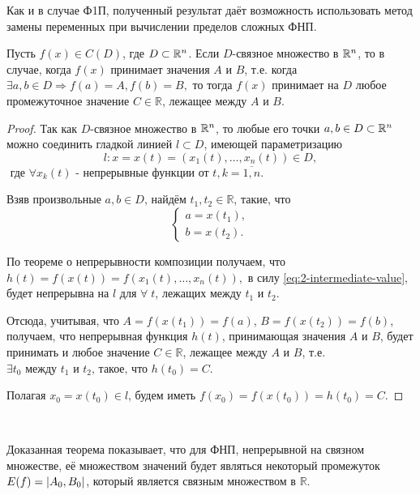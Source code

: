 \begin{note}
	Как и в случае Ф1П, полученный результат даёт возможность использовать метод замены переменных
	при вычислении пределов сложных ФНП.
\end{note}

\begin{theorem}
	Пусть $f(x) \in C(D)$, где $D \subset \mathbb{R}^{n}$. Если $D$-связное множество в $\mathbb{R}^{n}$, то в случае,
	когда $f(x)$ принимает значения $A$ и $B$, т.е. когда
  $   \exists a, b \in D \Rightarrow f(a) = A, f(b) =  B, $
	то тогда $f(x)$ принимает на $D$ любое промежуточное значение $C \in \mathbb{R}$, лежащее между
	$A$ и $B$.
\end{theorem}

\begin{proof}
	Так как $D$-связное множество в $\mathbb{R}^{n}$, то любые его точки $a, b \in D \subset \mathbb{R}^{n}$ можно
	соединить гладкой линией $l \subset D$, имеющей параметризацию
	\begin{equation}
		\label{eq:2-intermediate-value}
		l : x = x(t) = (x_1(t), \ldots, x_n(t)) \in D, 
	\end{equation}
    $
        \text{ где } 
        \forall x_k(t)
        \text{ - непрерывные функции от } t, k = \overline{1, n}.
    $   
    
	Взяв произвольные $a, b \in D$, найдём $t_1, t_2 \in \mathbb{R}$, такие, что
	\begin{equation*}
		\begin{cases}
			a = x(t_1),\\
			b = x(t_2).
		\end{cases}
	\end{equation*}
    
	По теореме о непрерывности композиции получаем, что
	$ %
		h(t) = f(x(t)) = f(x_1(t), \ldots, x_n(t)),
	$ %
	в силу \eqref{eq:2-intermediate-value}, будет непрерывна на $l$ для $\forall \; t$, лежащих
	между $t_1$ и $t_2$.

	Отсюда, учитывая, что ${A = f(x(t_1)) = f(a)}$, ${B = f(x(t_2)) = f(b)}$, получаем, что
	непрерывная функция $h(t)$, принимающая значения $A$ и $B$, будет принимать и любое значение
	$C \in \mathbb{R}$, лежащее между $A$ и $B$, т.е.
    $ \exists t_0 \text{ между } t_1 \text{ и } t_2 \text{, такое, что } h(t_0) = C. $
    
	Полагая $x_0 = x(t_0) \in l$, будем иметь $f(x_0) = f(x(t_0)) = h(t_0) = C.$
\end{proof}
$  $\newline
\begin{note}
	Доказанная теорема показывает, что для ФНП, непрерывной на связном множестве, её множеством
	значений будет являться некоторый промежуток $E(f) = \left\lvert A_0, B_0 \right\rvert$, который является связным
	множеством в $\mathbb{R}$.
\end{note}

